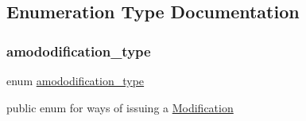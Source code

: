 \subsection{Enumeration Type Documentation}
\mbox{\label{group___modification___t_y_p_e_s_ga48fddcdd03a03f49b7e389ca1ed938d4}} 
\subsubsection{\texorpdfstring{amododification\+\_\+type}{amododification\_type}}
{\footnotesize\ttfamily enum \mbox{\hyperlink{group___modification___t_y_p_e_s_ga48fddcdd03a03f49b7e389ca1ed938d4}{amododification\+\_\+type}}}



public enum for ways of issuing a \mbox{\hyperlink{class_s_m_spp__di__unipi__it_1_1_modification}{Modification}} 

